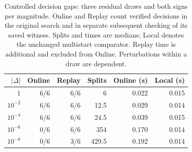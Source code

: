 \begin{table}[!ht]\centering\small
\begin{tabular}{rrrrrr}\toprule
$|\Delta|$ & Online & Replay & Splits & Online (s) & Local (s)\\\midrule
$1$ & 6/6 & 6/6 & 6 & 0.022 & 0.015\\
$10^{-2}$ & 6/6 & 6/6 & 12.5 & 0.029 & 0.014\\
$10^{-4}$ & 6/6 & 6/6 & 24.5 & 0.039 & 0.015\\
$10^{-6}$ & 0/6 & 6/6 & 354 & 0.170 & 0.014\\
$10^{-8}$ & 0/6 & 3/6 & 429.5 & 0.192 & 0.014\\
\bottomrule\end{tabular}
\caption{Controlled decision gaps: three residual draws and both signs per magnitude. Online and Replay count verified decisions in the original search and in separate subsequent checking of its saved witness. Splits and times are medians; Local denotes the unchanged multistart comparator. Replay time is additional and excluded from Online. Perturbations within a draw are dependent.}\label{tab:difficult}
\end{table}
